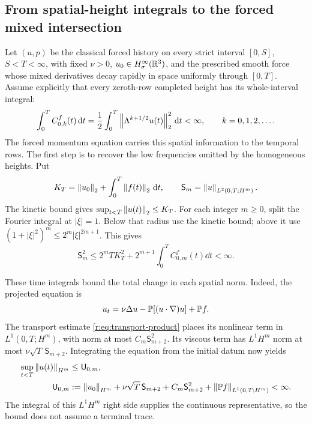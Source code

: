 \subsection{From spatial-height integrals to the forced mixed intersection}
\label{r:sec:forced-domain-propagation}

Let \((u,p)\) be the classical forced history on every strict interval
\([0,S]\), \(S<T<\infty\), with fixed \(\nu>0\),
\(u_0\in H^\infty_\sigma(\mathbb R^3)\), and the prescribed smooth force whose
mixed derivatives decay rapidly in space uniformly through \([0,T]\).
Assume explicitly that every zeroth-row completed height has its
whole-interval integral:
\begin{equation}
 \int_0^T C^f_{0,k}(t)\,\mathrm d t
 =\frac12\int_0^T\left\lVert \Lambda^{k+1/2}u(t)\right\rVert_2^2\,\mathrm d t<\infty,
 \qquad k=0,1,2,\ldots .
 \label{r:eq:forced-spatial-domain-hypothesis}
\end{equation}
The forced momentum equation carries this spatial information to the
temporal rows. The first step is to recover the low frequencies omitted
by the homogeneous heights. Put
\[
 K_T=\left\lVert u_0\right\rVert_2+\int_0^T\left\lVert f(t)\right\rVert_2\,\mathrm d t,
 \qquad \mathsf S_m=\left\lVert u\right\rVert_{L^2(0,T;H^m)}.
\]
The kinetic bound gives \(\sup_{t<T}\left\lVert u(t)\right\rVert_2\le K_T\).
For each integer \(m\ge0\), split the Fourier integral at \(|\xi|=1\).
Below that radius use the kinetic bound; above it use
\((1+|\xi|^2)^m\le2^m|\xi|^{2m+1}\). This gives
\begin{equation}
 \mathsf S_m^2
 \le2^mTK_T^2+2^{m+1}\int_0^T C^f_{0,m}(t)\dd t<\infty.
 \label{r:eq:forced-domain-spatial-integrals}
\end{equation}

These time integrals bound the total change in each spatial norm.
Indeed, the projected equation is
\[
 u_t=\nu\Delta u-\mathbb P[(u\cdot\nabla)u]+\mathbb P f.
\]
The transport estimate \eqref{r:eq:transport-product} places its nonlinear
term in \(L^1(0,T;H^m)\), with norm at most
\(C_m\mathsf S_{m+2}^2\). Its viscous term has \(L^1H^m\) norm at most
\(\nu\sqrt T\,\mathsf S_{m+2}\). Integrating the equation from the
initial datum now yields
\begin{equation}
 \begin{aligned}
 \sup_{t<T}\left\lVert u(t)\right\rVert_{H^m}
 &\le\mathsf U_{0,m},\\
 \mathsf U_{0,m}
 &:=\left\lVert u_0\right\rVert_{H^m}+\nu\sqrt T\,\mathsf S_{m+2}
       +C_m\mathsf S_{m+2}^2
       +\left\lVert \mathbb P f\right\rVert_{L^1(0,T;H^m)}<\infty.
 \end{aligned}
 \label{r:eq:forced-domain-base-row}
\end{equation}
The integral of this \(L^1H^m\) right side supplies the continuous
representative, so the bound does not assume a terminal trace.

